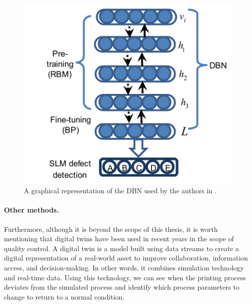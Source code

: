 \begin{figure}
    \centering
    \includegraphics[scale=0.5]{Images/DBN paper.png}
    \caption[DBN used to detect HS.]{A graphical representation of the DBN used by the authors in \cite{ye_defect_2018}.}
    \label{fig:dbnhsgrafica}
\end{figure}


\paragraph{Other methods.} Furthermore, although it is beyond the scope of this thesis, it is worth mentioning that digital twins have been used in recent years in the scope of quality control. A digital twin is a model built using data streams to create a digital representation of a real-world asset to improve collaboration, information access, and decision-making. In other words, it combines simulation technology and real-time data. Using this technology, we can see when the printing process deviates from the simulated process and identify which process parameters to change to return to a normal condition.
